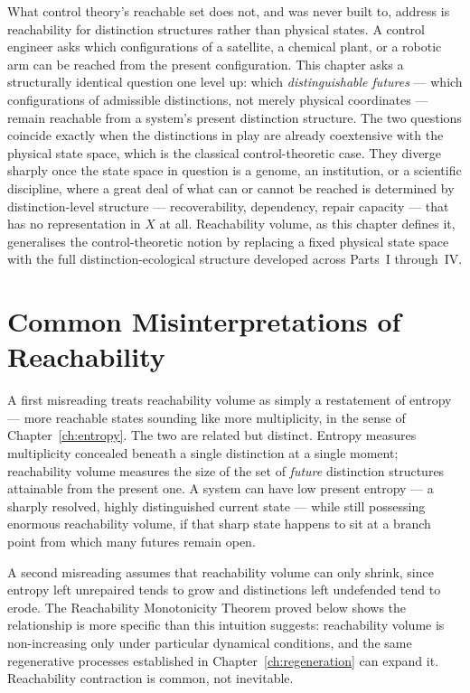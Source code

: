 \documentclass[12pt,twoside,openright]{book}
\begin{document}
What control theory's reachable set does not, and was never
built to, address is reachability for distinction structures
rather than physical states. A control engineer asks which
configurations of a satellite, a chemical plant, or a robotic
arm can be reached from the present configuration. This
chapter asks a structurally identical question one level up:
which \emph{distinguishable futures} --- which configurations
of admissible distinctions, not merely physical coordinates
--- remain reachable from a system's present distinction
structure. The two questions coincide exactly when the
distinctions in play are already coextensive with the
physical state space, which is the classical
control-theoretic case. They diverge sharply once the state
space in question is a genome, an institution, or a
scientific discipline, where a great deal of what can or
cannot be reached is determined by distinction-level
structure --- recoverability, dependency, repair capacity ---
that has no representation in $X$ at all. Reachability volume,
as this chapter defines it, generalises the control-theoretic
notion by replacing a fixed physical state space with the
full distinction-ecological structure developed across
Parts~I through~IV.

\section{Common Misinterpretations of Reachability}
\label{sec:ch13-misinterpretations}

A first misreading treats reachability volume as simply a
restatement of entropy --- more reachable states sounding
like more multiplicity, in the sense of
Chapter~\ref{ch:entropy}. The two are related but distinct.
Entropy measures multiplicity concealed beneath a single
distinction at a single moment; reachability volume measures
the size of the set of \emph{future} distinction structures
attainable from the present one. A system can have low
present entropy --- a sharply resolved, highly distinguished
current state --- while still possessing enormous
reachability volume, if that sharp state happens to sit at a
branch point from which many futures remain open.

A second misreading assumes that reachability volume can only
shrink, since entropy left unrepaired tends to grow and
distinctions left undefended tend to erode. The Reachability
Monotonicity Theorem proved below shows the relationship is
more specific than this intuition suggests: reachability
volume is non-increasing only under particular dynamical
conditions, and the same regenerative processes established
in Chapter~\ref{ch:regeneration} can expand it. Reachability
contraction is common, not inevitable.
\end{document}
